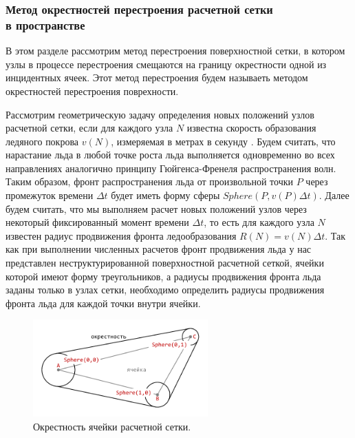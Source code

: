 \subsubsection{Метод окрестностей перестроения расчетной сетки \\ в пространстве}

В этом разделе рассмотрим метод перестроения поверхностной сетки, в котором узлы в процессе перестроения смещаются на границу окрестности одной из инцидентных ячеек.
Этот метод перестроения будем называеть методом окрестностей перестроения поврехности\label{term:method_remesh_okr}.

Рассмотрим геометрическую задачу определения новых положений узлов расчетной сетки, если для каждого узла $N$ известна скорость образования ледяного покрова $v(N)$, измеряемая в метрах в секунду \cite{Rybakov2023GeoRemesh}.
Будем считать, что нарастание льда в любой точке роста льда выполняется одновременно во всех направлениях аналогично принципу Гюйгенса-Френеля распространения волн.
Таким образом, фронт распространения льда от произвольной точки $P$ через промежуток времени $\Delta t$ будет иметь форму сферы $Sphere(P, v(P)\Delta t)$.
Далее будем считать, что мы выполняем расчет новых положений узлов через некоторый фиксированный момент времени $\Delta t$, то есть для каждого узла $N$ известен радиус продвижения фронта ледообразования $R(N) = v(N) \Delta t$.
Так как при выполнении численных расчетов фронт продвижения льда у нас представлен неструктурированной поверхностной расчетной сеткой, ячейки которой имеют форму треугольников, а радиусы продвижения фронта льда заданы только в узлах сетки, необходимо определить радиусы продвижения фронта льда для каждой точки внутри ячейки.

\begin{figure}[ht]
\centering
\includegraphics[width=0.6\textwidth]{./pics/text_1_remesh_common_envelope/triangle.pdf}
\singlespacing
{}\caption{Окрестность ячейки расчетной сетки.}
\label{fig:text_1_remesh_common_envelope_1}
\end{figure}

